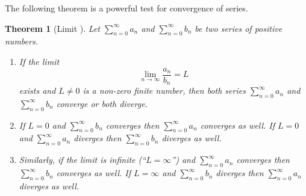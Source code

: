 \documentclass[12pt]{article}
\newtheorem{thm}{Theorem}
\begin{document}
The following theorem is a powerful test for convergence of series.

\begin{thm}[Limit ] Let $\sum_{n=0}^\infty a_n$ and
$\sum_{n=0}^\infty b_n$ be two series of positive numbers. \\
\begin{enumerate}
\item If the limit $$\lim_{n\to \infty} \frac{a_n}{b_n}=L$$ exists and $L\neq 0$ is a
non-zero finite number, then both series $\sum_{n=0}^\infty a_n$ and
$\sum_{n=0}^\infty b_n$ converge or both diverge.\\
\item If $L=0$ and $\sum_{n=0}^\infty b_n$ converges then $\sum_{n=0}^\infty a_n$ converges as well. If $L=0$ and $\sum_{n=0}^\infty a_n$ diverges then $\sum_{n=0}^\infty b_n$ diverges as well.\\
\item Similarly, if the limit is infinite (``$L=\infty$'') and  $\sum_{n=0}^\infty a_n$ converges then $\sum_{n=0}^\infty b_n$ converges as well. If $L=\infty$ and $\sum_{n=0}^\infty b_n$ diverges then $\sum_{n=0}^\infty a_n$ diverges as well.
\end{enumerate}
\end{thm}
\end{document}
